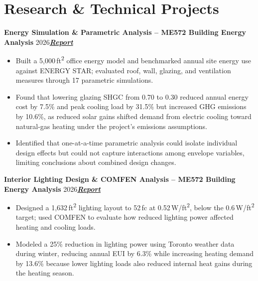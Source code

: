 \documentclass[letterpaper,10pt]{article}
\newcommand{\heading}[2]{\par\vspace{5pt}#1\hfill#2\par}
\newcommand{\link}[2]{\href{#1}{\textbf{\textit{#2}}}}
\begin{document}
\section{Research \& Technical Projects}
\heading{\textbf{Energy Simulation \& Parametric Analysis -- ME572 Building Energy Analysis} \textbar{} 2026}{\link{https://drive.google.com/file/d/1qgUcDs9oEhyyiolWMIB6J6YNq6vntja0/view?usp=sharing}{Report}}
\begin{itemize}
  \item Built a 5,000\,ft\textsuperscript{2} office energy model and benchmarked annual site energy use against ENERGY STAR; evaluated roof, wall, glazing, and ventilation measures through 17 parametric simulations.
  \item Found that lowering glazing SHGC from 0.70 to 0.30 reduced annual energy cost by 7.5\% and peak cooling load by 31.5\% but increased GHG emissions by 10.6\%, as reduced solar gains shifted demand from electric cooling toward natural-gas heating under the project's emissions assumptions.
  \item Identified that one-at-a-time parametric analysis could isolate individual design effects but could not capture interactions among envelope variables, limiting conclusions about combined design changes.
\end{itemize}

\heading{\textbf{Interior Lighting Design \& COMFEN Analysis -- ME572 Building Energy Analysis} \textbar{} 2026}{\link{https://drive.google.com/file/d/1wPKlTcNWM-JF55plGB3gbL2lsn6SgzUL/view?usp=sharing}{Report}}
\begin{itemize}
  \item Designed a 1,632\,ft\textsuperscript{2} lighting layout to 52\,fc at 0.52\,W/ft\textsuperscript{2}, below the 0.6\,W/ft\textsuperscript{2} target; used COMFEN to evaluate how reduced lighting power affected heating and cooling loads.
  \item Modeled a 25\% reduction in lighting power using Toronto weather data during winter, reducing annual EUI by 6.3\% while increasing heating demand by 13.6\% because lower lighting loads also reduced internal heat gains during the heating season.
\end{itemize}
\end{document}

